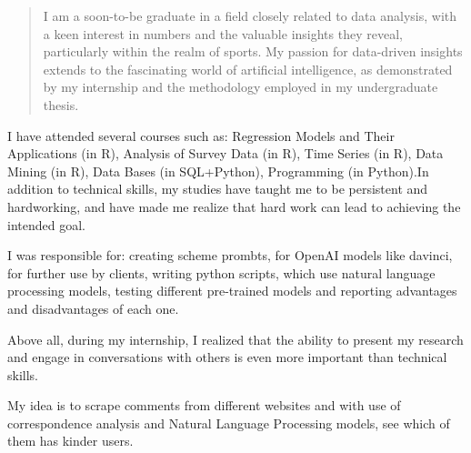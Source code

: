 \documentclass[10pt,a4paper,ragged2e,withhyper]{altacv}
\begin{document}
\begin{paracol}{2}
    \newpage

    \switchcolumn

        \begin{quote}
I am a soon-to-be graduate in a field closely related to data analysis, with a keen interest in numbers and the valuable insights they reveal, particularly within the realm of sports. My passion for data-driven insights extends to the fascinating world of artificial intelligence, as demonstrated by my internship and the methodology employed in my undergraduate thesis.
        \end{quote}

	I have attended several courses such as: Regression Models and Their Applications (in R), Analysis of Survey Data (in R), Time Series (in R), Data Mining (in R),  Data Bases (in SQL+Python), Programming (in Python).In addition to technical skills, my studies have taught me to be persistent and hardworking, and have made me realize that hard work can lead to achieving the intended goal.

    I was responsible for: creating scheme prombts, for OpenAI models like davinci, for further use by clients, writing python scripts, which use natural language processing models, testing different pre-trained models and reporting advantages and disadvantages of each one.
    
	  Above all, during my internship, I realized that the ability to present my research and engage in conversations with others is even more important than technical skills.
        \divider

My idea is to scrape comments from different websites and with use of correspondence analysis and Natural Language Processing models, see which of them has kinder users.


\end{paracol}
\end{document}
